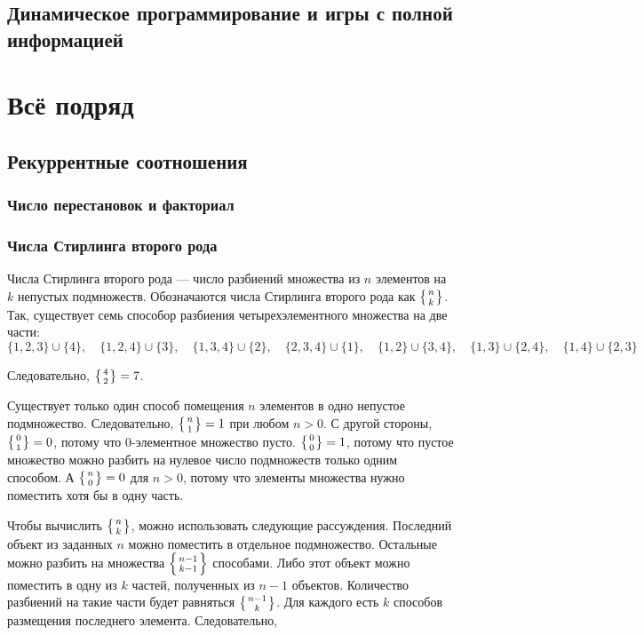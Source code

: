 \documentclass[14pt,openany]{book}
\begin{document}
\chapter{Динамическое программирование и игры с полной информацией}

\part{Всё подряд}

\chapter{Рекуррентные соотношения}



\section{Число перестановок и факториал}

\section{Числа Стирлинга второго рода}

Числа Стирлинга второго рода --- число разбиений множества из $n$ элементов на $k$
непустых подмножеств. Обозначаются числа Стирлинга второго рода как $\left\{{n}\atop{k}\right\}$.
Так, существует семь способор разбиения четырехэлементного множества на две части:
$$
  \{1,2,3\}\cup\{4\}, \quad \{1,2,4\}\cup\{3\}, \quad \{1,3,4\}\cup\{2\}, \quad \{2,3,4\}\cup\{1\},
  \quad \{1,2\}\cup\{3,4\}, \quad \{1,3\}\cup\{2,4\}, \quad \{1,4\}\cup\{2,3\}
$$

Следовательно, $\left\{{4}\atop{2}\right\} = 7$.

Существует только один способ помещения $n$ элементов в одно непустое подмножество.
Следовательно, $\left\{{n}\atop{1}\right\} = 1$ при любом $n>0$. С другой стороны, $\left\{{0}\atop{1}\right\} = 0$,
потому что $0$-элементное множество пусто. $\left\{{0}\atop{0}\right\} = 1$, потому что пустое множество
можно разбить на нулевое число подмножеств только одним способом. А $\left\{{n}\atop{0}\right\} = 0$ для
$n>0$, потому что элементы множества нужно поместить хотя бы в одну часть.

Чтобы вычислить $\left\{{n}\atop{k}\right\}$, можно использовать следующие рассуждения.
Последний объект из заданных $n$ можно поместить в отдельное подмножество. Остальные можно
разбить на множества $\left\{{n-1}\atop{k-1}\right\}$ способами. Либо этот объект можно поместить
в одну из $k$ частей, полученных из $n-1$ объектов. Количество разбиений на такие части
будет равняться $\left\{{n-1}\atop{k}\right\}$. Для каждого есть $k$ способов размещения последнего
элемента.
Следовательно,
\end{document}
